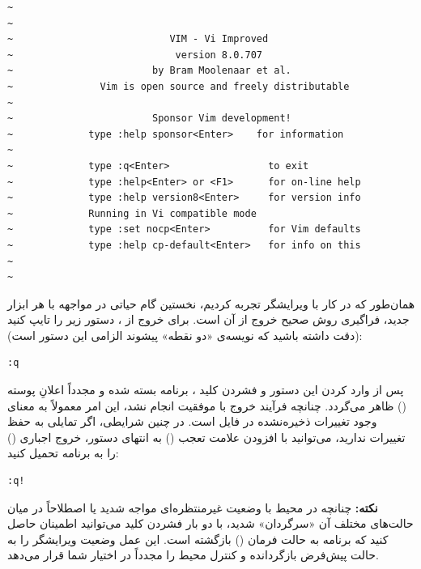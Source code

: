 \begin{latin}
\begin{lstlisting}
~
~
~                           VIM - Vi Improved
~                            version 8.0.707
~                        by Bram Moolenaar et al.
~               Vim is open source and freely distributable
~
~                        Sponsor Vim development!
~             type :help sponsor<Enter>    for information
~
~             type :q<Enter>                 to exit
~             type :help<Enter> or <F1>      for on-line help
~             type :help version8<Enter>     for version info
~             Running in Vi compatible mode
~             type :set nocp<Enter>          for Vim defaults
~             type :help cp-default<Enter>   for info on this
~
~
\end{lstlisting}
\end{latin}

همان‌طور که در کار با ویرایشگر  تجربه کردیم، نخستین گام حیاتی در مواجهه با هر ابزار جدید، فراگیری روش صحیح خروج از آن است. برای خروج از ، دستور زیر را تایپ کنید (دقت داشته باشید که نویسه‌ی «دو نقطه» پیشوند الزامی این دستور است):

\begin{latin}
\begin{lstlisting}
:q
\end{lstlisting}
\end{latin}

پس از وارد کردن این دستور و فشردن کلید ، برنامه بسته شده و مجدداً اعلانِ پوسته () ظاهر می‌گردد. چنانچه فرآیند خروج با موفقیت انجام نشد، این امر معمولاً به معنای وجود تغییرات ذخیره‌نشده در فایل است. در چنین شرایطی، اگر تمایلی به حفظ تغییرات ندارید، می‌توانید با افزودن علامت تعجب (\cmd{!}) به انتهای دستور، خروج اجباری () را به برنامه تحمیل کنید:

\begin{latin}
\begin{lstlisting}
:q!
\end{lstlisting}
\end{latin}

\begin{note}
\textbf{نکته:} چنانچه در محیط  با وضعیت غیرمنتظره‌ای مواجه شدید یا اصطلاحاً در میان حالت‌های مختلف آن «سرگردان» شدید، با دو بار فشردن کلید  می‌توانید اطمینان حاصل کنید که برنامه به حالت فرمان () بازگشته است. این عمل وضعیت ویرایشگر را به حالت پیش‌فرض بازگردانده و کنترل محیط را مجدداً در اختیار شما قرار می‌دهد.
\end{note}

